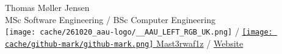 Thomas Møller Jensen \\
\tiny MSc Software Engineering / BSc Computer Engineering \\
\texttt{[image: cache/261020\_aau-logo/\_\_AAU\_LEFT\_RGB\_UK.png]}
\small / \href{https://github.com/Mast3rwaf1z}{\texttt{[image: cache/github-mark/github-mark.png]} Mast3rwaf1z}
/ \href{https://about.skademaskinen.win}{Website}